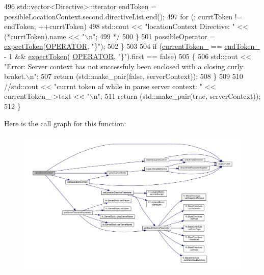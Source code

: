 \begin{DoxyCode}
496 \textcolor{comment}{                std::vector<Directive>::iterator    endToken =
       possibleLocationContext.second.directiveList.end();}
497 \textcolor{comment}{                for (; currtToken != endToken; ++currtToken)}
498 \textcolor{comment}{                    std::cout << "locationContext Directive: " << (*currtToken).name << "\(\backslash\)n";}
499 \textcolor{comment}{*/}
500             \}
501             possibleOperator = \hyperlink{classft_1_1_parser_a1615a752d3642bb53598e2c8db810db0}{expectToken}(\hyperlink{namespaceft_aa520fbf142ba1e7e659590c07da31921a6411d9d6073252e4d316493506bbb979}{OPERATOR}, \textcolor{stringliteral}{"\}"});
502         \}
503 
504         \textcolor{keywordflow}{if} (\hyperlink{classft_1_1_parser_a942c5b794d108f144c5b5028aaa34cb6}{currentToken\_} == \hyperlink{classft_1_1_parser_a538ba3ab8ee1d0cef5cc3c999f3ab44c}{endToken\_} - 1 && \hyperlink{classft_1_1_parser_a1615a752d3642bb53598e2c8db810db0}{expectToken}(
      \hyperlink{namespaceft_aa520fbf142ba1e7e659590c07da31921a6411d9d6073252e4d316493506bbb979}{OPERATOR}, \textcolor{stringliteral}{"\}"}).first == \textcolor{keyword}{false})
505         \{
506             std::cout << \textcolor{stringliteral}{"Error: Server context has not successfuly been enclosed with a closing curly
       braket.\(\backslash\)n"};
507             \textcolor{keywordflow}{return} (std::make\_pair(\textcolor{keyword}{false}, serverContext));
508         \}
509 
510         \textcolor{comment}{//std::cout << "currnt token af while in parse server context: " << currentToken\_->text << "\(\backslash\)n";}
511         \textcolor{keywordflow}{return} (std::make\_pair(\textcolor{keyword}{true}, serverContext));
512     \}
\end{DoxyCode}
Here is the call graph for this function\+:
\nopagebreak
\begin{figure}[H]
\begin{center}
\leavevmode
\includegraphics[width=350pt]{classft_1_1_parser_ae53bb700e0344f7af2519a5af3ae4230_cgraph}
\end{center}
\end{figure}
